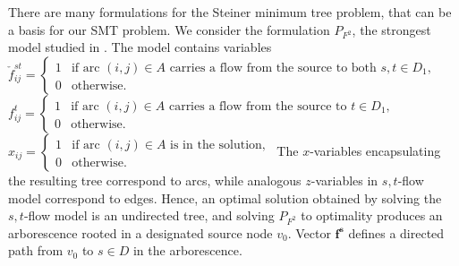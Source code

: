 There are many formulations for the Steiner minimum tree problem, that can be a basis for our SMT problem. We consider the formulation $P_{F^2}$, the strongest model studied in \cite{polzin}. The model contains variables
\newline\newline  
  $\check{f}^{st}_{ij}=
	\begin{cases}
    1 & \text{if arc $(i,j) \in A$ carries a flow from the source to both $s,t\in D_1$},\\
    0 & \text{otherwise}.
  \end{cases}$
\newline\newline  
  $f^{t}_{ij}=
	\begin{cases}
    1 & \text{if arc $(i,j) \in A$ carries a flow from the source to $t\in D_1$},\\
    0 & \text{otherwise}.
  \end{cases}$  
\newline\newline  
  $x_{ij}=
	\begin{cases}
    1 & \text{if arc $(i,j) \in A$ is in the solution},\\
    0 & \text{otherwise}.
  \end{cases}$  
\newline
\newline   
The $x$-variables encapsulating the resulting tree correspond to arcs, while analogous $z$-variables in $s,t$-flow model correspond to edges. Hence, an optimal solution obtained by solving the $s,t$-flow model is an undirected tree, and solving $P_{F^2}$ to optimality produces an arborescence rooted in a designated source node $v_0$. Vector $\mathbf{f^s}$ defines a directed path from $v_0$ to $s\in D$ in the arborescence.

